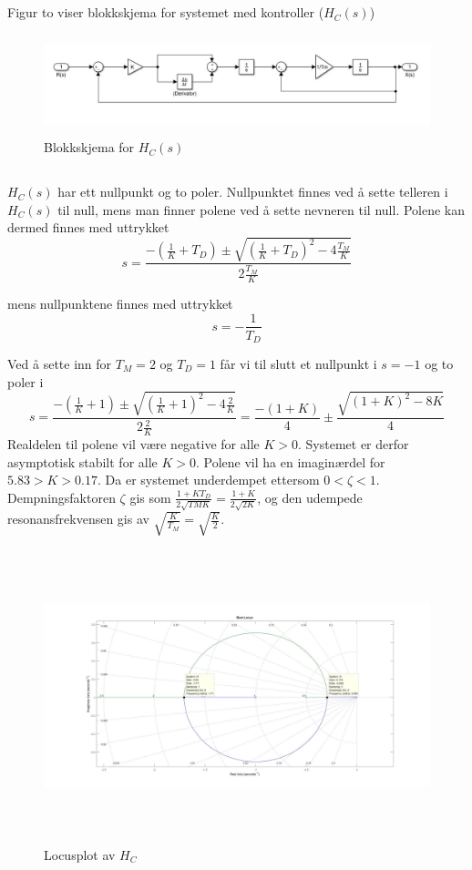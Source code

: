 \documentclass[norsk]{article}
\begin{document}
\subsection{ }
Figur to viser blokkskjema for systemet med kontroller (\(H_C(s)\))
\begin{figure}[!htb]
\includegraphics[height=2.9cm]{illustrations/oppg1d_illu}
\caption{Blokkskjema for \(H_C(s)\)}
\end{figure}

\subsection{ }
\(H_C(s)\) har ett nullpunkt og to poler. Nullpunktet finnes ved å sette telleren i \(H_C(s)\) til null, mens man finner polene ved å sette nevneren til null. Polene kan dermed finnes med uttrykket
\[s = \frac{-(\frac{1}{K} + T_D) \pm \sqrt{(\frac{1}{K} + T_D)^2 - 4\frac{T_M}{K}}}{2\frac{T_M}{K}}\]

mens nullpunktene finnes med uttrykket
\[s = -\frac{1}{T_D}\]

Ved å sette inn for \(T_M = 2\) og \(T_D = 1\) får vi til slutt et nullpunkt i \(s = -1\) og to poler i
\[s = \frac{-(\frac{1}{K} + 1) \pm \sqrt{(\frac{1}{K} + 1)^2 - 4\frac{2}{K}}}{2\frac{2}{K}} = \frac{-(1+K)}{4}\pm\frac{\sqrt{(1+K)^2-8K}}{4}\]
Realdelen til polene vil være negative for alle \(K > 0\). Systemet er derfor asymptotisk stabilt for alle \(K>0\). Polene vil ha en imaginærdel for \(5.83 > K > 0.17\). Da er systemet underdempet ettersom \(0 < \zeta < 1\). Dempningsfaktoren \(\zeta\) gis som \(\frac{1+KT_D}{2\sqrt{TMK}} = \frac{1+K}{2\sqrt{2K}}\), og den udempede resonansfrekvensen gis av \(\sqrt{\frac{K}{T_M}} = \sqrt{\frac{K}{2}}\).

\begin{figure}[H]
\hspace{-2cm}
\includegraphics[height=8.5cm]{illustrations/oppg1e_illu}
\caption{Locusplot av \(H_C\)}
\end{figure}
\end{document}
